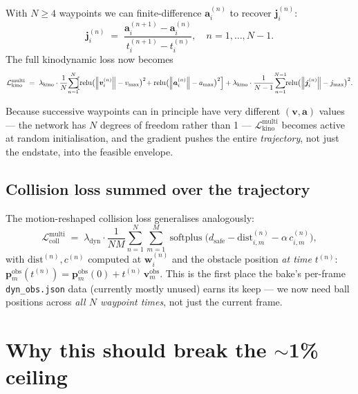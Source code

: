 \documentclass[11pt]{article}
\newcommand{\Norm}[1]{\left\lVert #1 \right\rVert}
\newcommand{\relu}{\operatorname{relu}}
\newcommand{\softplus}{\operatorname{softplus}}
\begin{document}
With $N \geq 4$ waypoints we can finite-difference $\bm{a}_i^{(n)}$ to recover
$\bm{j}_i^{(n)}$:
\begin{equation}
\bm{j}_i^{(n)}
\;=\;
\frac{\bm{a}_i^{(n+1)} - \bm{a}_i^{(n)}}{t_i^{(n+1)} - t_i^{(n)}},
\quad n = 1, \dots, N-1.
\end{equation}
The full kinodynamic loss now becomes
\begin{equation}\label{eq:kino-multi}
\mathcal{L}_{\text{kino}}^{\text{multi}}
\;=\;
\lambda_{\text{kino}}
\cdot
\frac{1}{N}\!\sum_{n=1}^{N}\!\!
\Bigl[
   \relu\bigl(\Norm{\bm{v}_i^{(n)}} - v_{\max}\bigr)^2 \!+
   \relu\bigl(\Norm{\bm{a}_i^{(n)}} - a_{\max}\bigr)^2
\Bigr]
+ \lambda_{\text{kino}} \cdot \frac{1}{N-1} \!\sum_{n=1}^{N-1}\!\!
   \relu\bigl(\Norm{\bm{j}_i^{(n)}} - j_{\max}\bigr)^2.
\end{equation}

Because successive waypoints can in principle have very different
$(\bm{v}, \bm{a})$ values --- the network has $N$ degrees of freedom rather than 1 ---
$\mathcal{L}_{\text{kino}}^{\text{multi}}$ becomes active at random
initialisation, and the gradient pushes the entire \emph{trajectory}, not just
the endstate, into the feasible envelope.

\subsection{Collision loss summed over the trajectory}

The motion-reshaped collision loss generalises analogously:
\begin{equation}\label{eq:coll-multi}
\mathcal{L}_{\text{coll}}^{\text{multi}}
\;=\;
\lambda_{\text{dyn}}
\cdot
\frac{1}{N M} \!\sum_{n=1}^{N} \sum_{m=1}^{M}
\softplus\!\bigl(d_{\text{safe}} - \mathrm{dist}_{i,m}^{(n)} -\alpha\, c_{i,m}^{(n)}\bigr),
\end{equation}
with $\mathrm{dist}^{(n)}, c^{(n)}$ computed at $\bm{w}_i^{(n)}$ and the obstacle
position \emph{at time} $t^{(n)}$:
\(
\bm{p}_m^{\text{obs}}(t^{(n)}) = \bm{p}_m^{\text{obs}}(0) + t^{(n)}\,\bm{v}_m^{\text{obs}}.
\)
This is the first place the bake's per-frame \texttt{dyn\_obs.json} data
(currently mostly unused) earns its keep --- we now need ball positions across
\emph{all $N$ waypoint times}, not just the current frame.

\section{Why this should break the $\sim$1\% ceiling}
\end{document}
